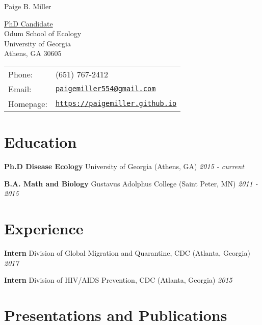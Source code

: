 \documentclass[letterpaper]{article}
\def\name{Paige B. Miller}
\renewenvironment{itemize}{
  \begin{list}{}{
    \setlength{\leftmargin}{1.5em}
  }
}{
  \end{list}
}
\begin{document}
{\huge \name}


\vspace{0.25in}

\begin{minipage}{0.45\linewidth}
  \href{}{PhD Candidate} \\
  Odum School of Ecology \\
  University of Georgia \\
  Athens, GA 30605
\end{minipage}
\begin{minipage}{0.45\linewidth}
  \begin{tabular}{ll}
    Phone: & (651) 767-2412 \\
    Email: & \href{mailto:paige.miller@uga.edu}{\tt paigemiller554@gmail.com} \\
    Homepage: & \href{https://paigemiller.github.io}{\tt https://paigemiller.github.io} \\
  \end{tabular}
\end{minipage}

\section*{Education}

\begin{itemize}
  \item \textbf{Ph.D Disease Ecology} University of Georgia (Athens, GA) 	\hfill \textit{2015 - current}
  \item \textbf{B.A. Math and Biology} Gustavus Adolphus College (Saint Peter, MN) \hfill  \textit{2011 - 2015}
\end{itemize}

\section*{Experience}

\begin{itemize}
  \item  \textbf{Intern} Division of Global Migration and Quarantine, CDC (Atlanta, Georgia)
   \hfill  \textit{2017}
  \item  \textbf{Intern} Division of HIV/AIDS Prevention, CDC (Atlanta, Georgia)
  \hfill  \textit{2015}
\end{itemize}

\section*{Presentations and Publications}
\end{document}
